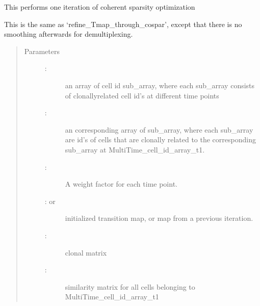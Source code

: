 \documentclass[letterpaper,10pt,english]{sphinxmanual}
\begin{document}
\begin{fulllineitems}
\label{\detokenize{cospar.tmap.refine_Tmap_through_cospar_noSmooth:cospar.tmap.refine_Tmap_through_cospar_noSmooth}}
This performs one iteration of coherent sparsity optimization

This is the same as ‘refine\_Tmap\_through\_cospar’, except that
there is no smoothing afterwards for demultiplexing.
\begin{quote}\begin{description}
\item[{Parameters}] \leavevmode\begin{description}
\item[{ : }] \leavevmode
an array of cell id sub\_array, where each sub\_array consists of
clonally\sphinxhyphen{}related cell id’s at different time points

\item[{ : }] \leavevmode
an corresponding array of sub\_array, where each sub\_array are id’s of
cells that are clonally related to the corresponding sub\_array at
MultiTime\_cell\_id\_array\_t1.

\item[{ : }] \leavevmode
A weight factor for each time point.

\item[{ :  or }] \leavevmode
initialized transition map, or map from a previous iteration.

\item[{ : }] \leavevmode
clonal matrix

\item[{ : }] \leavevmode
similarity matrix for all cells belonging
to MultiTime\_cell\_id\_array\_t1


\end{description}
\end{description}
\end{quote}
\end{fulllineitems}
\end{document}
